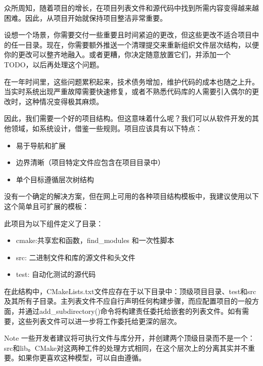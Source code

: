 

众所周知，随着项目的增长，在项目列表文件和源代码中找到所需内容变得越来越困难。因此，从项目开始就保持项目整洁非常重要。

设想一个场景，你需要交付一些重要且时间紧迫的更改，但这些更改不适合项目中的任一目录。现在，你需要额外推送一个清理提交来重新组织文件层次结构，以便你的更改可以整齐地融入。或者更糟，你决定随意放置它们，并添加一个TODO，以后再处理这个问题。

在一年时间里，这些问题累积起来，技术债务增加，维护代码的成本也随之上升。当实时系统出现严重故障需要快速修复，或者不熟悉代码库的人需要引入偶尔的更改时，这种情况变得极其麻烦。

因此，我们需要一个好的项目结构。但这意味着什么呢？我们可以从软件开发的其他领域，如系统设计，借鉴一些规则。项目应该具有以下特点：

\begin{itemize}
\item
易于导航和扩展

\item
边界清晰（项目特定文件应包含在项目目录中）

\item
单个目标遵循层次树结构
\end{itemize}

没有一个确定的解决方案，但在网上可用的各种项目结构模板中，我建议使用以下这个简单且可扩展的模板：


此项目为以下组件定义了目录：

\begin{itemize}
\item
cmake:共享宏和函数，find\_modules 和一次性脚本

\item
src: 二进制文件和库的源文件和头文件

\item
test: 自动化测试的源代码
\end{itemize}

在此结构中，CMakeLists.txt文件应存在于以下目录中：顶级项目目录、test和src及其所有子目录。主列表文件不应自行声明任何构建步骤，而应配置项目的一般方面，并通过add\_subdirectory()命令将构建责任委托给嵌套的列表文件。如有需要，这些列表文件可以进一步将工作委托给更深的层次。

\begin{myNotic}{Note}
一些开发者建议将可执行文件与库分开，并创建两个顶级目录而不是一个：src和lib。CMake对这两种工件的处理方式相同，在这个层次上的分离其实并不重要。如果你更喜欢这种模型，可以自由遵循。
\end{myNotic}

